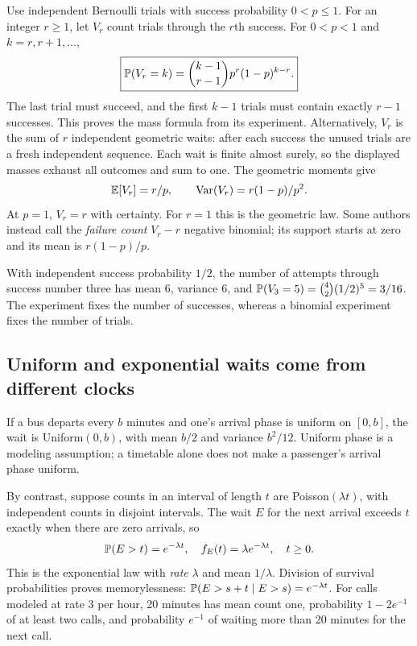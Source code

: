 Use independent Bernoulli trials with success probability $0<p\le1$.
For an integer $r\ge1$, let $V_r$ count trials through the $r$th success.
For $0<p<1$ and $k=r,r+1,\ldots$,
\[
\boxed{\P(V_r=k)=\binom{k-1}{r-1}p^r(1-p)^{k-r}.}
\]
The last trial must succeed, and the first $k-1$ trials must contain
exactly $r-1$ successes. This proves the mass formula from its experiment.
Alternatively, $V_r$ is the sum of $r$ independent geometric waits:
after each success the unused trials are a fresh independent sequence.
Each wait is finite almost surely, so the displayed masses exhaust all
outcomes and sum to one. The geometric moments give
\[
\E[V_r]=r/p,\qquad \Var(V_r)=r(1-p)/p^2.
\]
At $p=1$, $V_r=r$ with certainty. For $r=1$ this is the geometric law.
Some authors instead call the \emph{failure count} $V_r-r$ negative
binomial; its support starts at zero and its mean is $r(1-p)/p$.

\begin{example}
With independent success probability $1/2$, the number of attempts
through success number three has mean $6$, variance $6$, and
$\P(V_3=5)=\binom42(1/2)^5=3/16$.
The experiment fixes the number of successes, whereas a binomial
experiment fixes the number of trials.
\end{example}

\subsection{Uniform and exponential waits come from different clocks}

If a bus departs every $b$ minutes and one's arrival phase is uniform
on $[0,b]$, the wait is Uniform$(0,b)$, with mean $b/2$ and variance
$b^2/12$. Uniform phase is a modeling assumption; a timetable alone
does not make a passenger's arrival phase uniform.

By contrast, suppose counts in an interval of length $t$ are
Poisson$(\lambda t)$, with independent counts in disjoint intervals.
The wait $E$ for the next arrival exceeds $t$ exactly when there are
zero arrivals, so
\[
\P(E>t)=e^{-\lambda t},\quad
f_E(t)=\lambda e^{-\lambda t},\quad t\ge0.
\]
This is the exponential law with \emph{rate} $\lambda$ and mean
$1/\lambda$. Division of survival probabilities proves memorylessness:
$\P(E>s+t\mid E>s)=e^{-\lambda t}$.
For calls modeled at rate $3$ per hour, 20 minutes has mean count one,
probability $1-2e^{-1}$ of at least two calls, and probability $e^{-1}$
of waiting more than 20 minutes for the next call.

